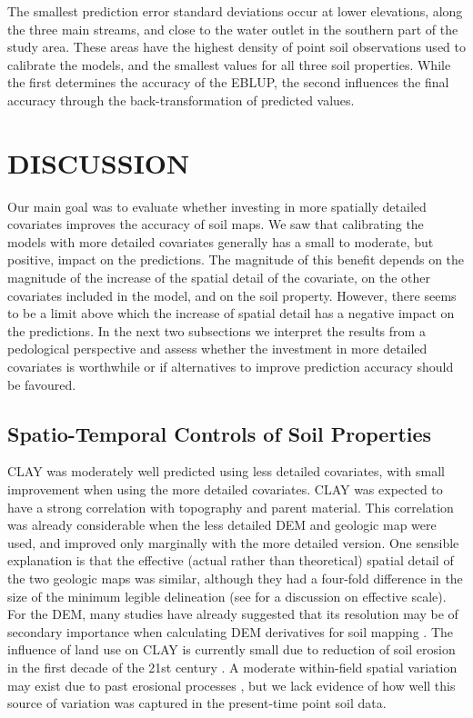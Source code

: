 The smallest prediction error standard deviations occur at lower elevations, along the three main streams, and 
close to the water outlet in the southern part of the study area. These areas have the highest density of 
point soil observations used to calibrate the models, and the smallest values for all three soil properties. 
While the first determines the accuracy of the EBLUP, the second influences the final accuracy through the 
back-transformation of predicted values.

\section{DISCUSSION}

Our main goal was to evaluate whether investing in more spatially detailed covariates improves the accuracy of 
soil maps. We saw that calibrating the models with more detailed covariates generally has a small to moderate, 
but positive, impact on the predictions. The magnitude of this benefit depends on the magnitude of the increase 
of the spatial detail of the covariate, on the other covariates included in the model, and on the soil 
property. However, there seems to be a limit above which the increase of spatial detail has a negative impact 
on the predictions. In the next two subsections we interpret the results from a pedological perspective and 
assess whether the investment in more detailed covariates is worthwhile or if alternatives to improve 
prediction accuracy should be favoured.

\subsection{Spatio-Temporal Controls of Soil Properties}

CLAY was moderately well predicted using less detailed covariates, with small improvement when using the more 
detailed covariates. CLAY was expected to have a strong correlation with topography and parent material. This 
correlation was already considerable when the less detailed DEM and geologic map were used, and improved only 
marginally with the more detailed version. One sensible explanation is that the effective (actual rather than 
theoretical) spatial detail of the two geologic maps was similar, although they had a four-fold difference in 
the size of the minimum legible delineation (see  for a discussion on effective 
scale). For the DEM, many studies have already suggested that its resolution may be of secondary importance 
when calculating DEM derivatives for soil mapping \cite{ZhuEtAl2008, BehrensEtAl2010a, MillerEtAl2015}. The 
influence of land use on CLAY is currently small due to reduction of soil erosion in the first decade of the 
\num{21}st century \cite{MiguelEtAl2012, TenCatenEtAl2012b}. A moderate within-field spatial variation may 
exist due to past erosional processes \cite{MouraBueno2012}, but we lack evidence of how well this source of 
variation was captured in the present-time point soil data.

